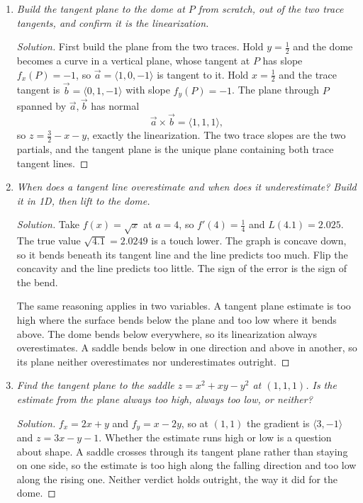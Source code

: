 \documentclass[12pt]{article}
\newenvironment{solution}
  {\renewcommand\qedsymbol{$\blacksquare$}\begin{proof}[Solution]}
  {\end{proof}}
\begin{document}
\begin{enumerate}
\begin{enumerate}
    \item \textit{Build the tangent plane to the dome at $P$ from scratch, out of the two trace tangents, and confirm it is the linearization.}

    \begin{solution}
    First build the plane from the two traces. Hold $y=\tfrac12$ and the dome becomes a curve in a vertical plane, whose tangent at $P$ has slope $f_x(P)=-1$, so $\vec a=\langle1,0,-1\rangle$ is tangent to it. Hold $x=\tfrac12$ and the trace tangent is $\vec b=\langle0,1,-1\rangle$ with slope $f_y(P)=-1$. The plane through $P$ spanned by $\vec a,\vec b$ has normal
    \[
      \vec a\times\vec b=\langle1,1,1\rangle,
    \]
    so $z=\tfrac32-x-y$, exactly the linearization. The two trace slopes are the two partials, and the tangent plane is the unique plane containing both trace tangent lines.
    \end{solution}

    \item \textit{When does a tangent line overestimate and when does it underestimate? Build it in 1D, then lift to the dome.}

    \begin{solution}
    Take $f(x)=\sqrt x$ at $a=4$, so $f'(4)=\tfrac14$ and $L(4.1)=2.025$. The true value $\sqrt{4.1}=2.0249$ is a touch lower. The graph is concave down, so it bends beneath its tangent line and the line predicts too much. Flip the concavity and the line predicts too little. The sign of the error is the sign of the bend.

    The same reasoning applies in two variables. A tangent plane estimate is too high where the surface bends below the plane and too low where it bends above. The dome bends below everywhere, so its linearization always overestimates. A saddle bends below in one direction and above in another, so its plane neither overestimates nor underestimates outright.
    \end{solution}

    \item \textit{Find the tangent plane to the saddle $z=x^2+xy-y^2$ at $(1,1,1)$. Is the estimate from the plane always too high, always too low, or neither?}

    \begin{solution}
    $f_x=2x+y$ and $f_y=x-2y$, so at $(1,1)$ the gradient is $\langle3,-1\rangle$ and $z=3x-y-1$. Whether the estimate runs high or low is a question about shape. A saddle crosses through its tangent plane rather than staying on one side, so the estimate is too high along the falling direction and too low along the rising one. Neither verdict holds outright, the way it did for the dome.
    \end{solution}


\end{enumerate}
\end{enumerate}
\end{document}
